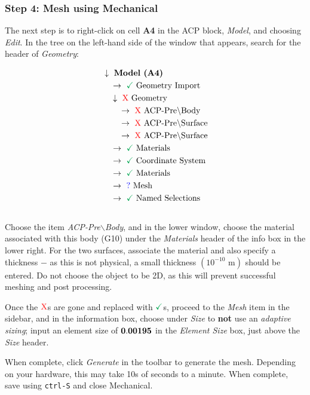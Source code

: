 \documentclass{amsdtx}
\begin{document}
\subsubsection{Step 4: Mesh using Mechanical}
The next step is to right-click on cell {\bf A4} in the ACP block, \textit{Model}, and choosing \textit{Edit}. In the tree on the left-hand side of the window that appears, search for the header of \textit{Geometry}:~\\[-3em]
\begin{multicols}{2}
	\begin{align*}
	&\downarrow ~\text{\bf Model (A4)} \\
	&\quad \rightarrow~{\color{Green}\checkmark}~\text{Geometry Import}\\
	&\quad \downarrow~{\color{red}\rm X}~\text{Geometry}\\
	&\quad \quad \rightarrow~{\color{red}\rm X}~\text{ACP-Pre$\backslash$Body}\\
	&\quad \quad \rightarrow~{\color{red}\rm X}~\text{ACP-Pre$\backslash$Surface}\\
	&\quad \quad \rightarrow~{\color{red}\rm X}~\text{ACP-Pre$\backslash$Surface}\\
	&\quad \rightarrow~{\color{Green}\checkmark}~\text{Materials}\\
	&\quad \rightarrow~{\color{Green}\checkmark}~\text{Coordinate System}\\
	&\quad \rightarrow~{\color{Green}\checkmark}~\text{Materials}\\
	&\quad \rightarrow~{\color{blue}\rm ?}~\text{Mesh}\\
	&\quad \rightarrow~{\color{Green}\checkmark}~\text{Named Selections}
\end{align*}
~\\[.5em]Choose the item \textit{ACP-Pre$\backslash$Body}, and in the lower window, choose the material associated with this body (G10) under the \textit{Materials} header of the info box in the lower right. For the two surfaces, associate the material and also specify a thickness $-$ as this is not physical, a small thickness $\left(10^{-10}\text{ m}\right)$ should be entered. Do not choose the object to be 2D, as this will prevent successful meshing and post processing.

Once the $\color{red} \rm X$s are gone and replaced with ${\color{Green}\checkmark}$s, proceed to the \textit{Mesh} item in the sidebar, and in the information box, choose under \textit{Size} to \textbf{\color{red} not} use an \textit{adaptive sizing}; input an element size of $\bf{0.00195}$ in the \textit{Element Size} box, just above the \textit{Size} header. 
\end{multicols}
When complete, click \textit{Generate} in the toolbar to generate the mesh. Depending on your hardware, this may take 10s of seconds to a minute. When complete, save using \verb|ctrl-S| and close Mechanical.
\end{document}
